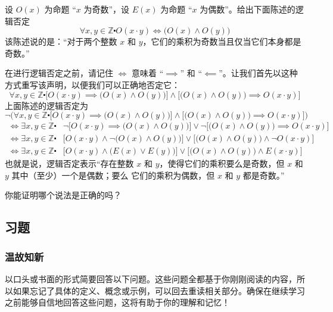 \begin{example}
    设 $O(x)$ 为命题 ``$x$ 为奇数''，设 $E(x)$ 为命题 ``$x$ 为偶数''。给出下面陈述的逻辑否定
    \[\forall x, y \in \mathbb{Z} \centerdot O(x \cdot y) \iff \big(O(x) \land O(y)\big)\]
    该陈述说的是：``对于两个整数 $x$ 和 $y$，它们的乘积为奇数当且仅当它们本身都是奇数。''

    在进行逻辑否定之前，请记住 $\iff$ 意味着 ``$\implies$'' 和 ``$\impliedby$''。让我们首先以这种方式重写该声明，以便我们可以正确地否定它：
    \[\forall x, y \in \mathbb{Z} \centerdot \Big[O(x \cdot y) \implies \big(O(x) \land O(y)\big)\Big] \land \Big[\big(O(x) \land O(y)\big) \implies O(x \cdot y)\Big]\]
    上面陈述的逻辑否定为
    \[\neg \bigg(\forall x, y \in \mathbb{Z} \centerdot \Big[O(x \cdot y) \implies \big(O(x) \land O(y)\big)\Big] \land \Big[\big(O(x) \land O(y)\big) \implies O(x \cdot y)\Big]\bigg) \]
    \begin{align*}
        \iff \exists x, y \in \mathbb{Z} \centerdot & \neg \Big[O(x \cdot y) \implies \big(O(x) \land O(y)\big)\Big] \lor \neg \Big[\big(O(x) \land O(y)\big) \implies O(x \cdot y)\Big] \\
        \iff \exists x, y \in \mathbb{Z} \centerdot & \Big[O(x \cdot y) \land \neg \big(O(x) \land O(y)\big)\Big] \lor \Big[\big(O(x) \land O(y)\big) \land \neg O(x \cdot y)\Big] \\
        \iff \exists x, y \in \mathbb{Z} \centerdot & \Big[O(x \cdot y) \land \big(E(x) \lor E(y)\big)\Big] \lor \Big[\big(O(x) \land O(y)\big) \land E(x \cdot y)\Big] 
    \end{align*}
    也就是说，逻辑否定表示``存在整数 $x$ 和 $y$，使得它们的乘积要么是奇数，但 $x$ 和 $y$ 其中（至少）一个是偶数；要么 它们的乘积为偶数，但 $x$ 和 $y$ 都是奇数。''

    你能证明哪个说法是正确的吗？
\end{example}

\subsection{习题}

\subsubsection*{温故知新}

以口头或书面的形式简要回答以下问题。这些问题全都基于你刚刚阅读的内容，所以如果忘记了具体的定义、概念或示例，可以回去重读相关部分。确保在继续学习之前能够自信地回答这些问题，这将有助于你的理解和记忆！

